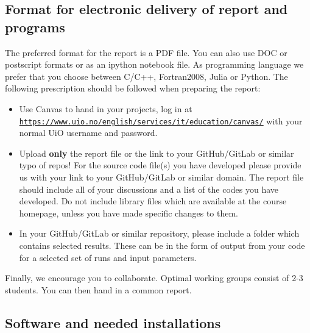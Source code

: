 \documentclass[%
oneside,                 %
final,                   %
10pt]{article}
\begin{document}

\newcommand{\exercisesection}[1]{\subsection*{#1}}



\subsection*{Format for electronic delivery of report and programs}

The preferred format for the report is a PDF file. You can also use DOC or postscript formats or as an ipython notebook file.  As programming language we prefer that you choose between C/C++, Fortran2008, Julia or Python. The following prescription should be followed when preparing the report:

\begin{itemize}
  \item Use Canvas to hand in your projects, log in  at  \href{{https://www.uio.no/english/services/it/education/canvas/}}{\nolinkurl{https://www.uio.no/english/services/it/education/canvas/}} with your normal UiO username and password.

  \item Upload \textbf{only} the report file or the link to your GitHub/GitLab or similar typo of  repos!  For the source code file(s) you have developed please provide us with your link to your GitHub/GitLab or similar  domain.  The report file should include all of your discussions and a list of the codes you have developed.  Do not include library files which are available at the course homepage, unless you have made specific changes to them.

  \item In your GitHub/GitLab or similar repository, please include a folder which contains selected results. These can be in the form of output from your code for a selected set of runs and input parameters.
\end{itemize}

\noindent
Finally, 
we encourage you to collaborate. Optimal working groups consist of 
2-3 students. You can then hand in a common report. 

\subsection*{Software and needed installations}
\end{document}
